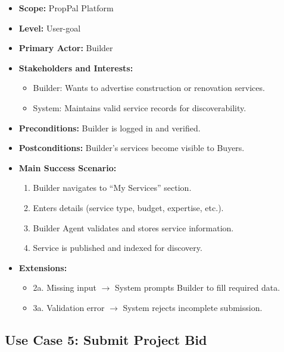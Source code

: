 \begin{itemize}
    \item \textbf{Scope:} PropPal Platform
    \item \textbf{Level:} User-goal
    \item \textbf{Primary Actor:} Builder
    \item \textbf{Stakeholders and Interests:}
    \begin{itemize}
        \item Builder: Wants to advertise construction or renovation services.
        \item System: Maintains valid service records for discoverability.
    \end{itemize}
    \item \textbf{Preconditions:} Builder is logged in and verified.
    \item \textbf{Postconditions:} Builder's services become visible to Buyers.
    \item \textbf{Main Success Scenario:}
    \begin{enumerate}
        \item Builder navigates to ``My Services'' section.
        \item Enters details (service type, budget, expertise, etc.).
        \item Builder Agent validates and stores service information.
        \item Service is published and indexed for discovery.
    \end{enumerate}
    \item \textbf{Extensions:}
    \begin{itemize}
        \item 2a. Missing input $\rightarrow$ System prompts Builder to fill required data.
        \item 3a. Validation error $\rightarrow$ System rejects incomplete submission.
    \end{itemize}
\end{itemize}

\subsection{Use Case 5: Submit Project Bid}

